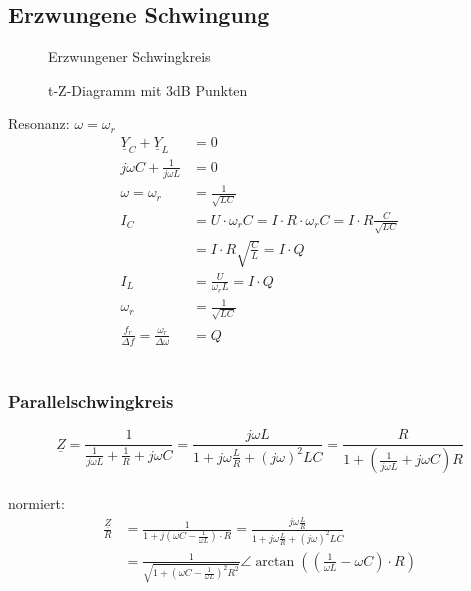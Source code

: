 \newpage
\subsection{Erzwungene Schwingung}

\begin{figure}[!h]
\centering
{}
\qquad
{}
\caption{Erzwungener Schwingkreis}
\label{fig:schwingkreise:erzwungene}
\end{figure}

\begin{figure}[!h]
	\centering
	
	\caption{t-Z-Diagramm mit 3dB Punkten}
	\label{fig:tZDiagramm}
\end{figure}



Resonanz: $\omega = \omega_r$\\
\begin{align}
	\underline{Y}_C +\underline{Y}_L &= 0\nonumber\\
	j\omega C+\frac{1}{j\omega L} &= 0\nonumber\\
	\omega=\omega_r&=\frac{1}{\sqrt{LC}}\nonumber\\
	I_C&=U\cdot\omega_rC=I\cdot R \cdot \omega_rC=I\cdot R
	\frac{C}{\sqrt{LC}}\nonumber\\
	&=I\cdot R \sqrt{\frac{C}{L}} = I \cdot Q\nonumber\\
	I_L&=\frac{U}{\omega_rL}=I \cdot Q\nonumber\\
	\omega_r&=\frac{1}{\sqrt{LC}}\nonumber\\
	\frac{f_r}{\Delta f}=\frac{\omega_r}{\Delta \omega} &= Q\nonumber
\end{align}\\


  
\subsubsection{Parallelschwingkreis}
$$\underline{Z} = \frac{1}{\frac{1}{j\omega L}+\frac{1}{R} + j \omega C}
= \frac{j\omega L}{1+j\omega \frac{L}{R}+(j\omega)^2LC}
= \frac{R}{1+(\frac{1}{j\omega L}+j\omega C)R}$$\\
normiert:\\
\begin{align}
\frac{\underline{Z}}{R}&=\frac{1}{1+j(\omega C-\frac{1}{\omega L})\cdot R}
=\frac{j\omega \frac{L}{R}}{1+j\omega\frac{L}{R}+(j\omega)^2LC}\nonumber\\
&=\frac{1}{\sqrt{1+(\omega C - \frac{1}{\omega
L})^2R^2}} \angle \arctan{((\frac{1}{\omega L}-\omega C)\cdot R)} \nonumber
\end{align}\\

